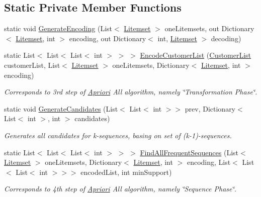 \subsection*{Static Private Member Functions}
\begin{DoxyCompactItemize}
\item 
static void \hyperlink{class_apriori_all_lib_1_1_apriori_all_algorithm_afc5e40088ea694ce9de76cd8f4d34900}{Generate\-Encoding} (List$<$ \hyperlink{class_apriori_all_lib_1_1_litemset}{Litemset} $>$ one\-Litemsets, out Dictionary$<$ \hyperlink{class_apriori_all_lib_1_1_litemset}{Litemset}, int $>$ encoding, out Dictionary$<$ int, \hyperlink{class_apriori_all_lib_1_1_litemset}{Litemset} $>$ decoding)
\item 
static List$<$ List$<$ List$<$ int $>$ $>$ $>$ \hyperlink{class_apriori_all_lib_1_1_apriori_all_algorithm_a2250ee6a09f30990fc8e6f50d0600bdc}{Encode\-Customer\-List} (\hyperlink{class_apriori_all_lib_1_1_customer_list}{Customer\-List} customer\-List, List$<$ \hyperlink{class_apriori_all_lib_1_1_litemset}{Litemset} $>$ one\-Litemsets, Dictionary$<$ \hyperlink{class_apriori_all_lib_1_1_litemset}{Litemset}, int $>$ encoding)
\begin{DoxyCompactList}\small\item\em Corresponds to 3rd step of \hyperlink{class_apriori_all_lib_1_1_apriori}{Apriori} All algorithm, namely \char`\"{}\-Transformation Phase\char`\"{}. \end{DoxyCompactList}\item 
static void \hyperlink{class_apriori_all_lib_1_1_apriori_all_algorithm_a1cb8e7f04ae25e5bc2203d35ba7fced3}{Generate\-Candidates} (List$<$ List$<$ int $>$$>$ prev, Dictionary$<$ List$<$ int $>$, int $>$ candidates)
\begin{DoxyCompactList}\small\item\em Generates all candidates for k-\/sequences, basing on set of (k-\/1)-\/sequences. \end{DoxyCompactList}\item 
static List$<$ List$<$ List$<$ int $>$ $>$ $>$ \hyperlink{class_apriori_all_lib_1_1_apriori_all_algorithm_ae57be8bc7c5996b4687db96e333acc6a}{Find\-All\-Frequent\-Sequences} (List$<$ \hyperlink{class_apriori_all_lib_1_1_litemset}{Litemset} $>$ one\-Litemsets, Dictionary$<$ \hyperlink{class_apriori_all_lib_1_1_litemset}{Litemset}, int $>$ encoding, List$<$ List$<$ List$<$ int $>$$>$$>$ encoded\-List, int min\-Support)
\begin{DoxyCompactList}\small\item\em Corresponds to 4th step of \hyperlink{class_apriori_all_lib_1_1_apriori}{Apriori} All algorithm, namely \char`\"{}\-Sequence Phase\char`\"{}. \end{DoxyCompactList}\item 
$$
\end{DoxyCompactItemize}

